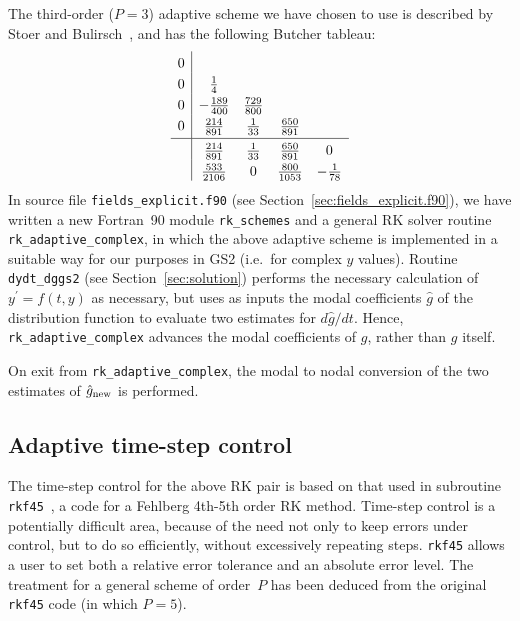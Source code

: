 \documentclass[10pt,a4paper]{article}
\begin{document}
The third-order ($P=3$) adaptive scheme we have chosen to use is described by
Stoer and Bulirsch~\cite{stoer_bulirsch}, and has the following Butcher
tableau:
\begin{equation}
\begin{array}{c|cccc}
\rule{0pt}{4mm} 0 & & & & \\
\rule{0pt}{4mm} 0 & \frac{1}{4} & & & \\
\rule{0pt}{4mm} 0 & -\frac{189}{400} & \frac{729}{800} & & \\
\rule[-2mm]{0pt}{6mm} 0 & \frac{214}{891} & \frac{1}{33} & \frac{650}{891} & \\ \hline
\rule{0pt}{4mm}  & \frac{214}{891} & \frac{1}{33} & \frac{650}{891} & 0 \\
\rule{0pt}{4mm}  & \frac{533}{2106} & 0 & \frac{800}{1053} & -\frac{1}{78} \\
\end{array}
\end{equation}
In source file \texttt{fields\_explicit.f90} (see
Section~\ref{sec:fields_explicit.f90}), we have written a new Fortran~90
module \texttt{rk\_schemes} and a general RK solver routine
\texttt{rk\_adaptive\_complex}, in which the above adaptive scheme is
implemented in a suitable way for our purposes in GS2 (i.e.\ for complex $y$
values). Routine \texttt{dydt\_dggs2} (see Section~\ref{sec:solution})
performs the necessary calculation of $y^\prime = f(t,y)$ as necessary, but
uses as inputs the modal coefficients $\hat{g}$ of the distribution function
to evaluate two estimates for $d\hat{g}/dt$. Hence,
\texttt{rk\_adaptive\_complex} advances the modal coefficients of $g$, rather
than $g$ itself.

On exit from \texttt{rk\_adaptive\_complex}, the modal to nodal conversion of
the two estimates of $\hat{g}_{\mbox{\scriptsize new}}$ is performed.

\subsection{Adaptive time-step control}
\label{sec:control}

The time-step control for the above RK pair is based on that used in
subroutine \texttt{rkf45}~\cite{rkf45}, a code for a Fehlberg 4th-5th order RK
method. Time-step control is a potentially difficult area, because of the need
not only to keep errors under control, but to do so efficiently, without
excessively repeating steps. \texttt{rkf45} allows a user to set both a
relative error tolerance and an absolute error level. The treatment for a
general scheme of order~$P$ has been deduced from the original \texttt{rkf45}
code (in which $P=5$).
\end{document}
